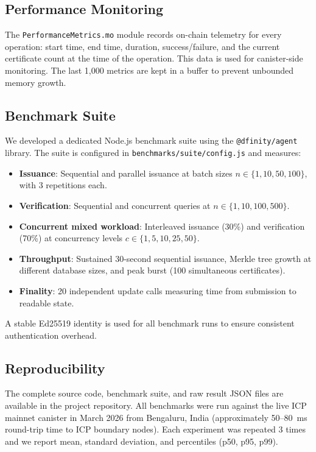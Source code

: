 \documentclass[conference]{IEEEtran}
\begin{document}
\subsection{Performance Monitoring}

The \texttt{PerformanceMetrics.mo} module records on-chain telemetry for every operation: start time, end time, duration, success/failure, and the current certificate count at the time of the operation. This data is used for canister-side monitoring. The last 1,000 metrics are kept in a buffer to prevent unbounded memory growth.

\subsection{Benchmark Suite}

We developed a dedicated Node.js benchmark suite using the \texttt{@dfinity/agent} library. The suite is configured in \texttt{benchmarks/suite/config.js} and measures:

\begin{itemize}[leftmargin=*]
  \item \textbf{Issuance}: Sequential and parallel issuance at batch sizes $n \in \{1, 10, 50, 100\}$, with 3 repetitions each.
  \item \textbf{Verification}: Sequential and concurrent queries at $n \in \{1, 10, 100, 500\}$.
  \item \textbf{Concurrent mixed workload}: Interleaved issuance (30\%) and verification (70\%) at concurrency levels $c \in \{1, 5, 10, 25, 50\}$.
  \item \textbf{Throughput}: Sustained 30-second sequential issuance, Merkle tree growth at different database sizes, and peak burst (100 simultaneous certificates).
  \item \textbf{Finality}: 20 independent update calls measuring time from submission to readable state.
\end{itemize}

A stable Ed25519 identity is used for all benchmark runs to ensure consistent authentication overhead.

\subsection{Reproducibility}

The complete source code, benchmark suite, and raw result JSON files are available in the project repository. All benchmarks were run against the live ICP mainnet canister in March 2026 from Bengaluru, India (approximately 50--80~ms round-trip time to ICP boundary nodes). Each experiment was repeated 3 times and we report mean, standard deviation, and percentiles (p50, p95, p99).
\end{document}
